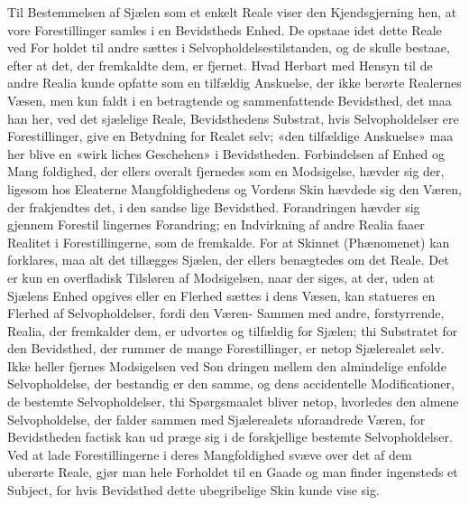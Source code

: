 \documentclass[12pt,a4paper]{book}
\begin{document}
Til Bestemmelsen af Sjælen som et enkelt Reale viser
den Kjendsgjerning hen, at vore Forestillinger samles i en
Bevidstheds Enhed. De opstaae idet dette Reale ved For\-%
holdet til andre sættes i Selvopholdelsestilstanden, og de skulle
bestaae, efter at det, der fremkaldte dem, er fjernet. Hvad
Herbart med Hensyn til de andre Realia kunde opfatte som
en tilfældig Anskuelse, der ikke berørte Realernes Væsen, men
kun faldt i en betragtende og sammenfattende Bevidsthed, det
maa han her, ved det sjælelige Reale, Bevidsthedens Substrat,
hvis Selvopholdelser ere Forestillinger, give en Betydning for
Realet selv; «den tilfældige Anskuelse» maa her blive en «wirk\-%
liches Geschehen» i Bevidstheden. Forbindelsen af Enhed og Mang\-%
foldighed, der ellers overalt fjernedes som en Modsigelse, hævder
sig der, ligesom hos Eleaterne Mangfoldighedens og Vordens
Skin hævdede sig den Væren, der frakjendtes det, i den sandse\-%
lige Bevidsthed. Forandringen hævder sig gjennem Forestil\-%
lingernes Forandring; en Indvirkning af andre Realia faaer
Realitet i Forestillingerne, som de fremkalde. For at Skinnet
(Phænomenet) kan forklares, maa alt det tillægges Sjælen, der
ellers benægtedes om det Reale. Det er kun en overfladisk
Tilsløren af Modsigelsen, naar der siges, at der, uden at
Sjælens Enhed opgives eller en Flerhed sættes i dens Væsen,
kan statueres en Flerhed af Selvopholdelser, fordi den Væren-%
Sammen med andre, forstyrrende, Realia, der fremkalder dem,
er udvortes og tilfældig for Sjælen; thi Substratet for den
Bevidsthed, der rummer de mange Forestillinger, er netop
Sjælerealet selv. Ikke heller fjernes Modsigelsen ved Son\-%
dringen mellem den almindelige enfolde Selvopholdelse, der
bestandig er den samme, og dens accidentelle Modificationer,
de bestemte Selvopholdelser, thi Spørgsmaalet bliver netop,
hvorledes den almene Selvopholdelse, der falder sammen med
Sjælerealets uforandrede Væren, for Bevidstheden factisk kan ud\-%
præge sig i de forskjellige bestemte Selvopholdelser. Ved at
lade Forestillingerne i deres Mangfoldighed svæve over det af
dem uberørte Reale, gjør man hele Forholdet til en Gaade og
man finder ingensteds et Subject, for hvis Bevidsthed dette
ubegribelige Skin kunde vise sig.
\end{document}
